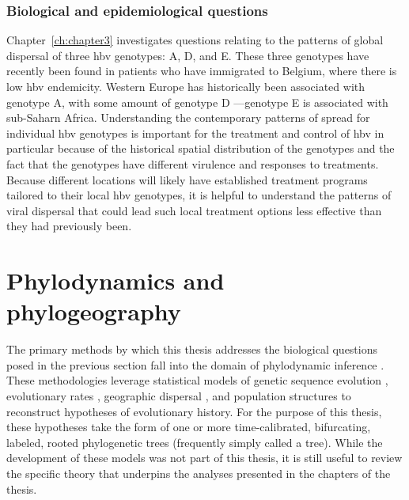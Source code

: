 \subsubsection{Biological and epidemiological questions}
Chapter~\ref{ch:chapter3} investigates questions relating to the patterns of global dispersal of three \gls{hbv} genotypes: A, D, and E.
These three genotypes have recently been found in patients who have immigrated to Belgium, where there is low \gls{hbv} endemicity.
Western Europe has historically been associated with genotype A, with some amount of genotype D \citep{shi2013hepatitis}---genotype E is associated with sub-Saharn Africa.
Understanding the contemporary patterns of spread for individual \gls{hbv} genotypes is important for the treatment and control of \gls{hbv} in particular because of the historical spatial distribution of the genotypes and the fact that the genotypes have different virulence and responses to treatments.
Because different locations will likely have established treatment programs tailored to their local \gls{hbv} genotypes, it is helpful to understand the patterns of viral dispersal that could lead such local treatment options less effective than they had previously been.

\section{Phylodynamics and phylogeography}
The primary methods by which this thesis addresses the biological questions posed in the previous section fall into the domain of phylodynamic inference \citep{volz2013viral}.
These methodologies leverage statistical models of genetic sequence evolution \citep{jukes1969evolution,hasegawa1985dating}, evolutionary rates \citep{baele2012improving,ho2014molecular}, geographic dispersal \citep{lemey2009bayesian,lemey2010phylogeography,dellicour2022accommodating}, and population structures \citep{drummond2005bayesian,minin2008smooth,gill2013improving} to reconstruct hypotheses of evolutionary history.
For the purpose of this thesis, these hypotheses take the form of one or more time-calibrated, bifurcating, labeled, rooted phylogenetic trees (frequently simply called a tree).
While the development of these models was not part of this thesis, it is still useful to review the specific theory that underpins the analyses presented in the chapters of the thesis.

